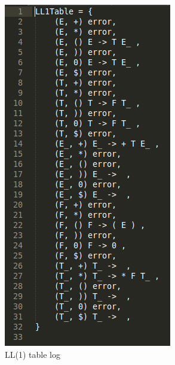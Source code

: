 \documentclass{beamer}
\begin{document}
  \begin{frame}
\begin{figure}
    \centering
    \begin{subfigure}[b]{0.3\textwidth}
        \includegraphics[height=0.8\textheight]{LogLL1Table.png}
        \caption{LL(1) table log}
        \label{fig:ll1table}
    \end{subfigure}
    ~ %
    \begin{subfigure}[b]{0.3\textwidth}

\end{subfigure}
\end{figure}
\end{frame}
\end{document}
